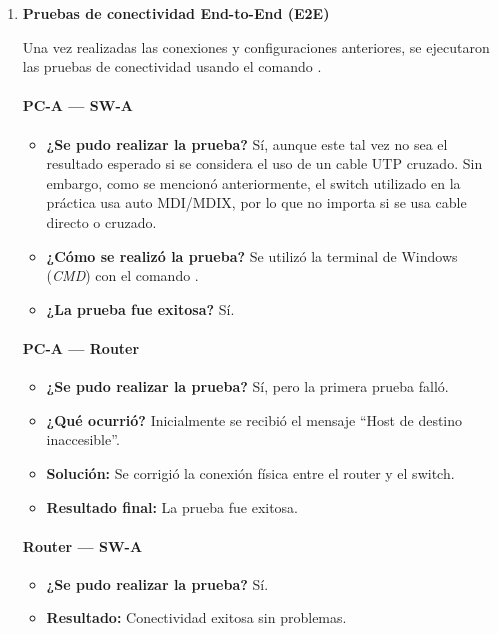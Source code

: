 \begin{enumerate}[series=labsteps]
\subsubsection*{Evidencias}
\begin{itemize}
\item Capturas de la configuración de la interfaz del router.
\end{itemize}


\item \textbf{Pruebas de conectividad End-to-End (E2E)}

  Una vez realizadas las conexiones y configuraciones anteriores, se ejecutaron las pruebas de 
  conectividad usando el comando .

  \paragraph{PC-A — SW-A}
  \begin{itemize}
    \item \textbf{¿Se pudo realizar la prueba?} Sí, aunque este tal vez no sea el resultado esperado si se considera el
      uso de un cable UTP cruzado. Sin embargo, como se mencionó anteriormente, el switch utilizado en la práctica usa
      auto MDI/MDIX, por lo que no importa si se usa cable directo o cruzado.
    \item \textbf{¿Cómo se realizó la prueba?} Se utilizó la terminal de Windows (\textit{CMD}) con el comando .
    \item \textbf{¿La prueba fue exitosa?} Sí.
  \end{itemize}

  \paragraph{PC-A — Router}
  \begin{itemize}
    \item \textbf{¿Se pudo realizar la prueba?} Sí, pero la primera prueba falló.
    \item \textbf{¿Qué ocurrió?} Inicialmente se recibió el mensaje “Host de destino inaccesible”.
    \item \textbf{Solución:} Se corrigió la conexión física entre el router y el switch.
    \item \textbf{Resultado final:} La prueba fue exitosa.
  \end{itemize}

  \paragraph{Router — SW-A}
  \begin{itemize}
    \item \textbf{¿Se pudo realizar la prueba?} Sí.
    \item \textbf{Resultado:} Conectividad exitosa sin problemas.
  \end{itemize}


\end{enumerate}
